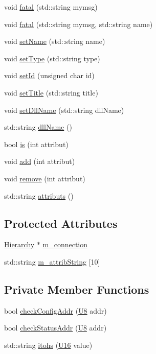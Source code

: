 \begin{DoxyCompactItemize}
\item 
void \hyperlink{classObject_aad5a16aac7516ce65bd5ec02ab07fc80}{fatal} (std::string mymsg)
\item 
void \hyperlink{classObject_ae62acd3d09f716220f75f252dc38bc9a}{fatal} (std::string mymsg, std::string name)
\item 
void \hyperlink{classObject_ae30fea75683c2d149b6b6d17c09ecd0c}{setName} (std::string name)
\item 
void \hyperlink{classObject_aae534cc9d982bcb9b99fd505f2e103a5}{setType} (std::string type)
\item 
void \hyperlink{classObject_a398fe08cba594a0ce6891d59fe4f159f}{setId} (unsigned char id)
\item 
void \hyperlink{classObject_a89557dbbad5bcaa02652f5d7fa35d20f}{setTitle} (std::string title)
\item 
void \hyperlink{classObject_a870c5af919958c2136623b2d7816d123}{setDllName} (std::string dllName)
\item 
std::string \hyperlink{classObject_a2e3947f2870094c332d7454117f3ec63}{dllName} ()
\item 
bool \hyperlink{classAttrib_a704f26af560909ad22065083bb7d4c34}{is} (int attribut)
\item 
void \hyperlink{classAttrib_a235f773af19c900264a190b00a3b4ad7}{add} (int attribut)
\item 
void \hyperlink{classAttrib_a7d4ef7e32d93cb287792b87b857e79f3}{remove} (int attribut)
\item 
std::string \hyperlink{classAttrib_aee7bbf16b144887f196e1341b24f8a26}{attributs} ()
\end{DoxyCompactItemize}
\subsection*{Protected Attributes}
\begin{DoxyCompactItemize}
\item 
\hyperlink{classHierarchy}{Hierarchy} $\ast$ \hyperlink{classElement_abe3de7a5dbbc9a6dd2d7e012e5fdb266}{m\_\-connection}
\item 
std::string \hyperlink{classAttrib_a3414521d7a82476e874b25a5407b5e63}{m\_\-attribString} \mbox{[}10\mbox{]}
\end{DoxyCompactItemize}
\subsection*{Private Member Functions}
\begin{DoxyCompactItemize}
\item 
bool \hyperlink{classLSDelayChipV1_aa8118972150a9e1e95e9006e003c0206}{checkConfigAddr} (\hyperlink{LSDelayChipV1_8h_a3cb25ca6f51f003950f9625ff05536fc}{U8} addr)
\item 
bool \hyperlink{classLSDelayChipV1_a5083f29a93d38258d9de00dd5a89af99}{checkStatusAddr} (\hyperlink{LSDelayChipV1_8h_a3cb25ca6f51f003950f9625ff05536fc}{U8} addr)
\item 
std::string \hyperlink{classLSDelayChipV1_af7f4d72fb404b6b3d7b41fd01876ed0a}{itohs} (\hyperlink{LSDelayChipV1_8h_adf928e51a60dba0df29d615401cc55a8}{U16} value)
\end{DoxyCompactItemize}
